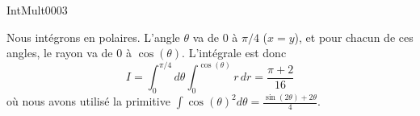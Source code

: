 
\begin{corrige}{IntMult0003}

Nous intégrons en polaires. L'angle $\theta$ va de $0$ à $\pi/4$ ($x=y$), et pour chacun de ces angles, le rayon va de $0$ à $\cos(\theta)$. L'intégrale est donc
\begin{equation}
	I=\int_0^{\pi/4}d\theta\int_0^{\cos(\theta)}r\,dr=\frac{ \pi+2 }{ 16 }
\end{equation}
où nous avons utilisé la primitive $\int\cos(\theta)^2d\theta=\frac{ \sin(2\theta)+2\theta }{ 4 }$.

\end{corrige}
